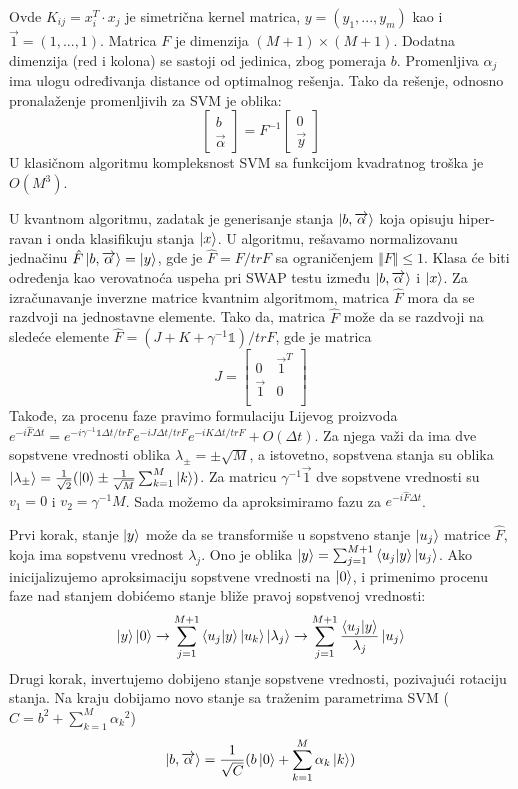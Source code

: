 \documentclass[12pt, letterpaper, oneside]{article}
\begin{document}
Ovde $K_{ij} = x_i^T \cdot x_j$ je simetrična kernel matrica, $y = (y_1,...,y_m)$ kao i
$\overrightarrow{1} = (1,...,1)$. Matrica $F$ je dimenzija $(M+1)\times(M+1)$. Dodatna dimenzija (red i kolona) se sastoji od jedinica,
zbog pomeraja $b$. Promenljiva $\alpha_j$ ima ulogu određivanja distance od optimalnog rešenja. Tako da rešenje, odnosno pronalaženje promenljivih za SVM je oblika:
\[
    \begin{bmatrix}
        b \\
        \overrightarrow{\alpha}
    \end{bmatrix} =
    F^{-1} \begin{bmatrix}
        0 \\
        \overrightarrow{y}
    \end{bmatrix}
\]
U klasičnom algoritmu kompleksnost SVM sa funkcijom kvadratnog troška je $O(M^3)$.

U kvantnom algoritmu, zadatak je generisanje stanja $\Ket{b,\overrightarrow{\alpha}}$ koja opisuju hiper-ravan i onda klasifikuju stanja
$\Ket{x}$. U algoritmu, rešavamo normalizovanu jednačinu $\hat{F}\Ket{b,\overrightarrow{\alpha}} = \Ket{y}$, gde je $\hat{F} = F/trF$ sa 
ograničenjem $\Vert F \Vert \leq 1$. Klasa će biti određenja kao verovatnoća uspeha pri SWAP testu između $\Ket{b,\overrightarrow{\alpha}}$ i
$\Ket{x}$. Za izračunavanje inverzne matrice kvantnim algoritmom, matrica $\hat{F}$ mora da se razdvoji na jednostavne elemente.
Tako da, matrica $\hat{F}$ može da se razdvoji na sledeće elemente $\hat{F} = (J+K+\gamma^{-1}\mathbb{1})/trF$,
gde je matrica
\[
    J = \begin{bmatrix}
        0 & \overrightarrow{1}^T \\
        \overrightarrow{1} & 0 \\
    \end{bmatrix}
\]
Takođe, za procenu faze pravimo formulaciju Lijevog proizvoda \\
$e^{-i\hat{F}\varDelta{t}} = e^{-i\gamma^{-1}\mathbb{1}\varDelta{t}/trF}e^{-iJ\varDelta{t}/trF}e^{-iK\varDelta{t}/trF} + O(\varDelta{t})$.
Za njega važi da ima dve sopstvene vrednosti oblika $\lambda_{\pm} = \pm \sqrt{M}$, a istovetno, 
sopstvena stanja su oblika $\Ket{\lambda_{\pm}} = \frac{1}{\sqrt{2}}(\Ket{0} \pm \frac{1}{\sqrt{M}}\sum_{k=1}^M\Ket{k})$.
Za matricu $\gamma^{-1}\overrightarrow{1}$ dve sopstvene vrednosti su $v_1 = 0$ i $v_2 = \gamma^{-1}M$.
Sada možemo da aproksimiramo fazu za $e^{-i\hat{F}\varDelta{t}}$.

Prvi korak, stanje $\Ket{y}$ može da se transformiše u sopstveno stanje $\Ket{u_j}$ matrice $\hat{F}$, koja ima sopstvenu vrednost $\lambda_j$.
Ono je oblika $\Ket{y} = \sum_{j=1}^{M+1}\braket{u_j|y}\Ket{u_j}$. Ako inicijalizujemo aproksimaciju sopstvene vrednosti na $\Ket{0}$, i primenimo 
procenu faze nad stanjem dobićemo stanje bliže pravoj sopstvenoj vrednosti:
\[
  \Ket{y}\Ket{0} \to \sum_{j=1}^{M+1}\braket{u_j|y}\Ket{u_k}\Ket{\lambda_j} \to \sum_{j=1}^{M+1}\frac{\braket{u_j|y}}{\lambda_j}\Ket{u_j}
\]
Drugi korak, invertujemo dobijeno stanje sopstvene vrednosti, pozivajući rotaciju stanja. Na kraju dobijamo novo stanje sa traženim parametrima SVM ($C = b^2 + \sum_{k=1}^M{\alpha_k}^2$)
\[
    \Ket{b,\overrightarrow{\alpha}} = \frac{1}{\sqrt{C}}(b\Ket{0}+ \sum_{k=1}^M{\alpha_k \Ket{k}})
\]
\end{document}
